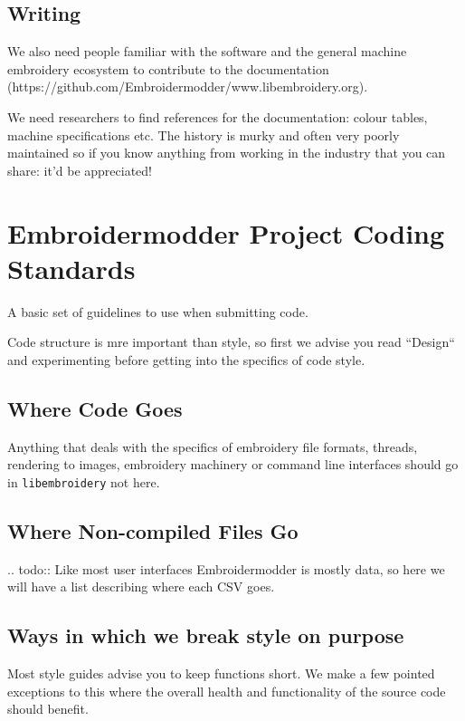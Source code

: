 \documentclass[a4paper]{report}
\begin{document}
\subsection{Writing}

We also need people familiar with the software and the general
machine embroidery ecosystem to contribute to the
documentation (https://github.com/Embroidermodder/www.libembroidery.org).

We need researchers to find references for the documentation: colour tables,
machine specifications etc. The history is murky and often very poorly maintained
so if you know anything from working in the industry that you can share: it'd be
appreciated!

\section{Embroidermodder Project Coding Standards}

A basic set of guidelines to use when submitting code.

Code structure is mre important than style, so first we advise you read
``Design`` and experimenting before getting into the specifics of code style.

\subsection{Where Code Goes}

Anything that deals with the specifics of embroidery file formats, threads,
rendering to images, embroidery machinery or command line interfaces should go 
in \texttt{libembroidery} not here.

\subsection{Where Non-compiled Files Go}

.. todo::
   Like most user interfaces Embroidermodder is mostly data,
   so here we will have a list describing where each CSV goes.

\subsection{Ways in which we break style on purpose}

Most style guides advise you to keep functions short. We make a few pointed
exceptions to this where the overall health and functionality of the source code should benefit.
\end{document}
